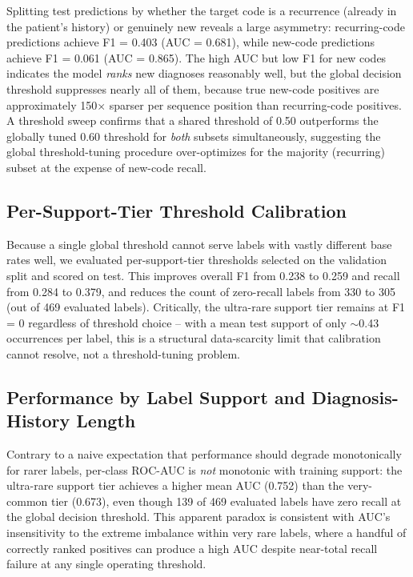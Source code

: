 \documentclass[11pt]{article}
\begin{document}
Splitting test predictions by whether the target code is a recurrence (already
in the patient's history) or genuinely new reveals a large asymmetry:
recurring-code predictions achieve F1 = 0.403 (AUC = 0.681), while new-code
predictions achieve F1 = 0.061 (AUC = 0.865). The high AUC but low F1 for new
codes indicates the model \emph{ranks} new diagnoses reasonably well, but the
global decision threshold suppresses nearly all of them, because true new-code
positives are approximately 150$\times$ sparser per sequence position than
recurring-code positives. A threshold sweep confirms that a shared threshold
of 0.50 outperforms the globally tuned 0.60 threshold for \emph{both} subsets
simultaneously, suggesting the global threshold-tuning procedure
over-optimizes for the majority (recurring) subset at the expense of new-code
recall.

\subsection{Per-Support-Tier Threshold Calibration}

Because a single global threshold cannot serve labels with vastly different
base rates well, we evaluated per-support-tier thresholds selected on the
validation split and scored on test. This improves overall F1 from 0.238 to
0.259 and recall from 0.284 to 0.379, and reduces the count of
zero-recall labels from 330 to 305 (out of 469 evaluated labels). Critically,
the ultra-rare support tier remains at F1 = 0 regardless of threshold choice
-- with a mean test support of only $\sim$0.43 occurrences per label, this is
a structural data-scarcity limit that calibration cannot resolve, not a
threshold-tuning problem.

\subsection{Performance by Label Support and Diagnosis-History Length}

Contrary to a naive expectation that performance should degrade monotonically
for rarer labels, per-class ROC-AUC is \emph{not} monotonic with training
support: the ultra-rare support tier achieves a higher mean AUC (0.752) than
the very-common tier (0.673), even though 139 of 469 evaluated labels have
zero recall at the global decision threshold. This apparent paradox is
consistent with AUC's insensitivity to the extreme imbalance within very rare
labels, where a handful of correctly ranked positives can produce a high AUC
despite near-total recall failure at any single operating threshold.
\end{document}
